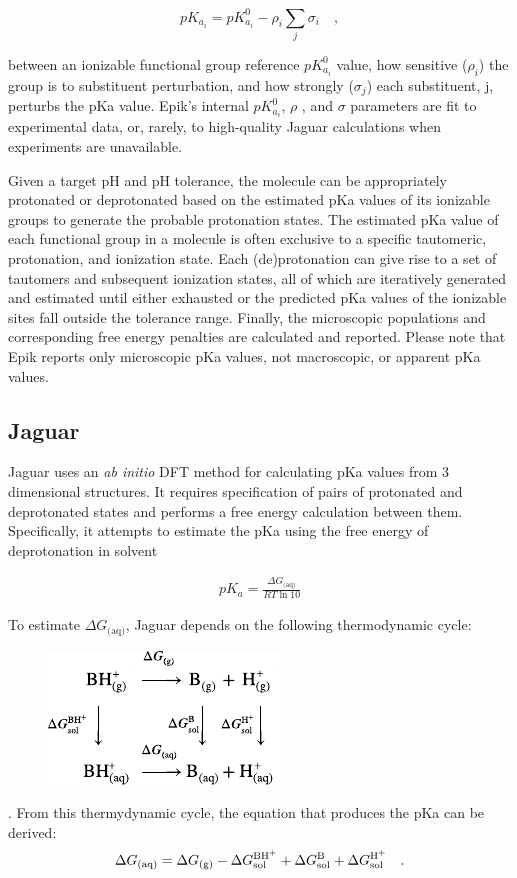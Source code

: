 \documentclass[9pt,lineno,final]{elife}
\begin{document}
\begin{equation}
 pK_{a_i} = pK_{a_i}^0 - \rho_i  \sum_j \sigma_i \quad ,
\end{equation}

between an ionizable functional group reference $pK_{a_i}^0$ value, how sensitive ($\rho_i$) the group is to substituent perturbation, and how strongly ($\sigma_j$) each substituent, j, perturbs the pKa value. Epik’s internal $pK_{a_i}^0$, $\rho$ , and $\sigma$  parameters are fit to experimental data, or, rarely, to high-quality Jaguar calculations when experiments are unavailable.

Given a target pH and pH tolerance, the molecule can be appropriately protonated or deprotonated based on the estimated pKa values of its ionizable groups to generate the probable protonation states. The estimated pKa value of each functional group in a molecule is often exclusive to a specific tautomeric, protonation, and ionization state. Each (de)protonation can give rise to a set of tautomers and subsequent ionization states, all of which are iteratively generated and estimated until either exhausted or the predicted pKa values of the ionizable sites fall outside the tolerance range. Finally, the microscopic populations and corresponding free energy penalties are calculated and reported. Please note that Epik reports only microscopic pKa values, not macroscopic, or apparent pKa values.

\subsection{Jaguar}

Jaguar uses an \textit{ab initio} DFT method for calculating pKa values from 3 dimensional structures. It requires specification of pairs of protonated and deprotonated states and performs a free energy calculation between them. Specifically, it attempts to estimate the pKa using the free energy of deprotonation in solvent

\begin{align}
 pK_a = \frac{\Delta G_\textrm{(aq)}}{RT \ln 10}  
\end{align}

To estimate $ \Delta G_\textrm{(aq)}$, Jaguar depends on the following thermodynamic cycle:
%
\begin{figure}[H]
\centering
 \includegraphics{jaguar-reaction.pdf}
\end{figure}
%
. From this thermydynamic cycle, the equation that produces the pKa can be derived:
%
\begin{equation}
 \Delta G_\textrm{(aq)} = \Delta G_\textrm{(g)} - \Delta G^\textrm{\ce{BH+}}_\textrm{sol} + \Delta G^\textrm{\ce{B}}_\textrm{sol}  +  \Delta G^\textrm{\ce{H+}}_\textrm{sol} \quad .
\end{equation}
\end{document}
